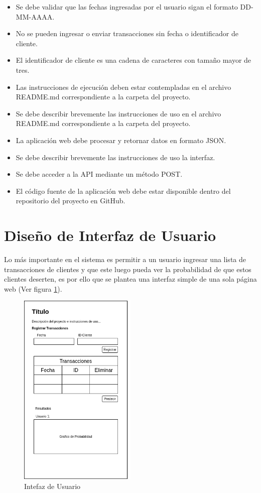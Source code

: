 \begin{itemize}
	\item Se debe validar que las fechas ingresadas por el usuario sigan el formato DD-MM-AAAA.
	\item No se pueden ingresar o enviar transacciones sin fecha o identificador de cliente.
	\item El identificador de cliente es una cadena de caracteres con tamaño mayor de tres.
	\item Las instrucciones de ejecución deben estar contempladas en el archivo README.md correspondiente a la carpeta del proyecto.
	\item Se debe describir brevemente las instrucciones de uso en el archivo README.md correspondiente a la carpeta del proyecto.
	\item La aplicación web debe procesar y retornar datos en formato JSON.
	\item Se debe describir brevemente las instrucciones de uso la interfaz.
	\item Se debe acceder a la API mediante un método POST.
	\item El código fuente de la aplicación web debe estar disponible dentro del repositorio del proyecto en GitHub.
\end{itemize}

\section{Diseño de Interfaz de Usuario}

Lo más importante en el sistema es permitir a un usuario ingresar una lista de transacciones de clientes y que este luego pueda ver la probabilidad de que estos clientes deserten, es por ello que se plantea una interfaz simple de una sola página web (Ver figura \ref{fig:ui}).

\begin{figure}[H]
	\centering \includegraphics[width=0.50\textwidth]{images/ui.png}
	\caption{Intefaz de Usuario}
	\label{fig:ui}
\end{figure}

